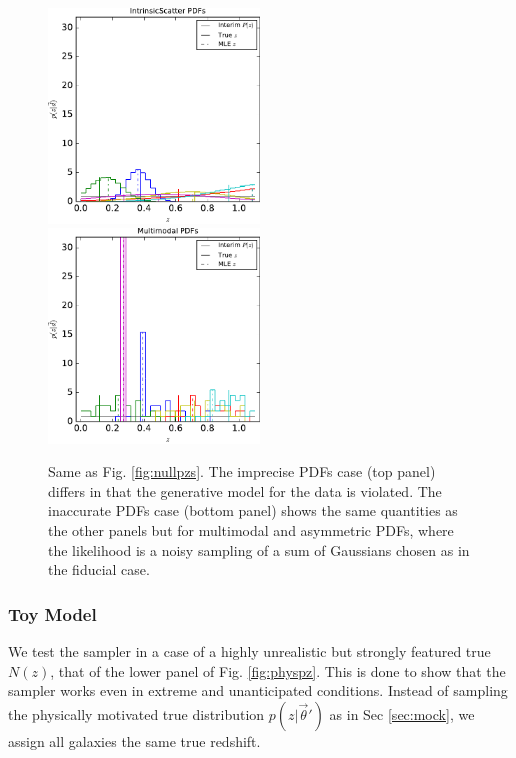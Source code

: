 \documentclass[preprint]{aastex}
\begin{document}
\begin{figure}
\includegraphics[width=0.5\textwidth]{figs/vars/samplepzs.pdf}\\
\includegraphics[width=0.5\textwidth]{figs/mult/samplepzs.pdf}
\caption{Same as Fig. \ref{fig:nullpzs}.  The imprecise PDFs case (top panel) 
differs in that the generative model for the data is violated.  The inaccurate 
PDFs case (bottom panel) shows the same quantities as the other panels but for 
multimodal and asymmetric PDFs, where the likelihood is a noisy sampling of a 
sum of Gaussians chosen as in the fiducial case.}
\label{fig:allpzs}
\end{figure}

\subsubsection{Toy Model}
\label{sec:fake-data}

We test the sampler in a case of a highly unrealistic but strongly featured 
true $N(z)$, that of the lower panel of Fig. \ref{fig:physpz}.  This is done to 
show that the sampler works even in extreme and unanticipated conditions.  
Instead of sampling the physically motivated true distribution 
$p(z|\vec{\theta}')$ as in Sec \ref{sec:mock}, we assign all galaxies the same 
true redshift.  
\end{document}

